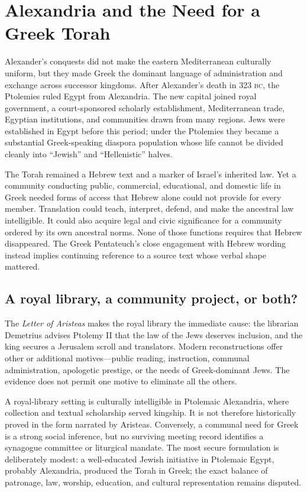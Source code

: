 \section{Alexandria and the Need for a Greek Torah}

Alexander's conquests did not make the eastern Mediterranean culturally uniform, but they made Greek the dominant language of administration and exchange across successor kingdoms. After Alexander's death in 323 \textsc{bc}, the Ptolemies ruled Egypt from Alexandria. The new capital joined royal government, a court-sponsored scholarly establishment, Mediterranean trade, Egyptian institutions, and communities drawn from many regions. Jews were established in Egypt before this period; under the Ptolemies they became a substantial Greek-speaking diaspora population whose life cannot be divided cleanly into “Jewish” and “Hellenistic” halves.

The Torah remained a Hebrew text and a marker of Israel's inherited law. Yet a community conducting public, commercial, educational, and domestic life in Greek needed forms of access that Hebrew alone could not provide for every member. Translation could teach, interpret, defend, and make the ancestral law intelligible. It could also acquire legal and civic significance for a community ordered by its own ancestral norms. None of those functions requires that Hebrew disappeared. The Greek Pentateuch's close engagement with Hebrew wording instead implies continuing reference to a source text whose verbal shape mattered.

\subsection{A royal library, a community project, or both?}

The \emph{Letter of Aristeas} makes the royal library the immediate cause: the librarian Demetrius advises Ptolemy II that the law of the Jews deserves inclusion, and the king secures a Jerusalem scroll and translators. Modern reconstructions offer other or additional motives---public reading, instruction, communal administration, apologetic prestige, or the needs of Greek-dominant Jews. The evidence does not permit one motive to eliminate all the others.

A royal-library setting is culturally intelligible in Ptolemaic Alexandria, where collection and textual scholarship served kingship. It is not therefore historically proved in the form narrated by Aristeas. Conversely, a communal need for Greek is a strong social inference, but no surviving meeting record identifies a synagogue committee or liturgical mandate. The most secure formulation is deliberately modest: a well-educated Jewish initiative in Ptolemaic Egypt, probably Alexandria, produced the Torah in Greek; the exact balance of patronage, law, worship, education, and cultural representation remains disputed.

